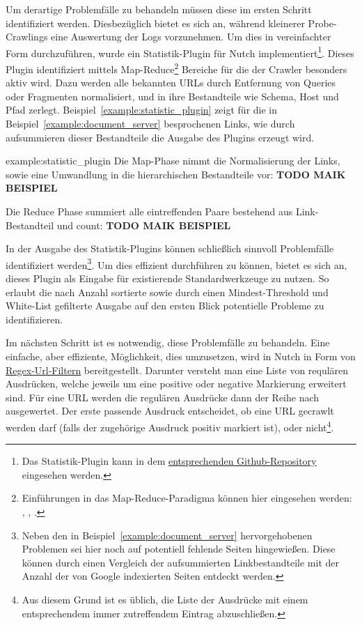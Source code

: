Um derartige Problemfälle zu behandeln müssen diese im ersten Schritt identifiziert werden.
Diesbezüglich bietet es sich an, während kleinerer Probe-Crawlings eine Auswertung der Logs vorzunehmen.
Um dies in vereinfachter Form durchzuführen,
wurde ein Statistik-Plugin für Nutch implementiert\footnote{Das Statistik-Plugin kann in dem
\href{https://github.com/DaniloMorgado/url_statistic_plugin}{entsprechenden Github-Repository} eingesehen werden.}.
Dieses Plugin identifiziert mittels
Map-Reduce\footnote{Einführungen in das Map-Reduce-Paradigma können hier eingesehen werden: \cite{wiki.mapreduce},
\cite{nosql.mapreduce}, \cite{hadoop.mapreduce}.}
Bereiche für die der Crawler besonders aktiv wird.
Dazu werden alle bekannten URLs durch Entfernung
von Queries oder Fragmenten normalisiert, und in ihre Bestandteile wie Schema, Host und Pfad zerlegt.
Beispiel~\ref{example:statistic_plugin} zeigt für die in
Beispiel~\ref{example:document_server} besprochenen Links,
wie durch aufsummieren dieser Bestandteile die Ausgabe des Plugins erzeugt wird.

\begin{example}{example:statistic_plugin}
Die Map-Phase nimmt die Normalisierung der Links, sowie eine Umwandlung in die hierarchischen Bestandteile vor: \textbf{TODO MAIK BEISPIEL}

Die Reduce Phase summiert alle eintreffenden Paare bestehend aus Link-Bestandteil und count: \textbf{TODO MAIK BEISPIEL}
\end{example}
	
In der Ausgabe des Statistik-Plugins können schließlich sinnvoll Problemfälle identifiziert
werden\footnote{Neben den in Beispiel~\ref{example:document_server} hervorgehobenen Problemen sei hier noch auf potentiell fehlende Seiten hingewießen.
Diese können durch einen Vergleich der aufsummierten Linkbestandteile mit der Anzahl der von Google indexierten Seiten entdeckt werden.}.
Um dies effizient durchführen zu können,
bietet es sich an, dieses Plugin als Eingabe für existierende Standardwerkzeuge zu nutzen.
So erlaubt die nach Anzahl sortierte sowie durch einen Mindest-Threshold und White-List gefilterte Ausgabe
auf den ersten Blick potentielle Probleme zu identifizieren.

Im nächsten Schritt ist es notwendig, diese Problemfälle zu behandeln.
Eine einfache, aber effiziente, Möglichkeit, dies umzusetzen, wird in Nutch in Form von \href{https://github.com/apache/nutch/blob/master/conf/regex-urlfilter.txt.template}{Regex-Url-Filtern} bereitgestellt.
Darunter versteht man eine Liste von requlären Ausdrücken, welche jeweils um eine positive oder negative Markierung erweitert sind.
Für eine URL werden die regulären Ausdrücke dann der Reihe nach ausgewertet.
Der erste passende Ausdruck entscheidet, ob eine URL gecrawlt werden darf (falls der zugehörige Ausdruck positiv markiert ist),
oder nicht\footnote{Aus diesem Grund ist es üblich, 
die Liste der Ausdrücke mit einem entsprechendem immer zutreffendem Eintrag abzuschließen.}.

